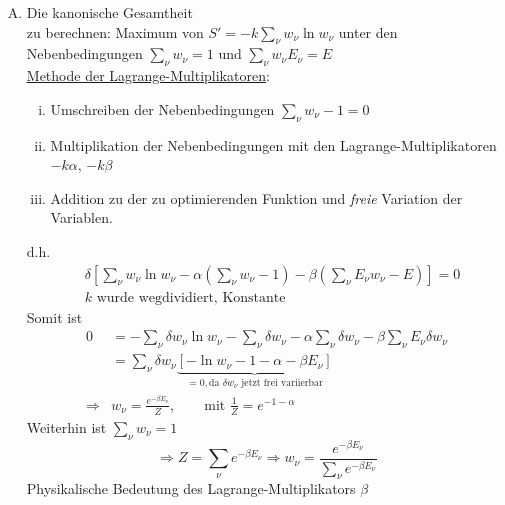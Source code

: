 \begin{enumerate}[A)]
    \item Die kanonische Gesamtheit\\
    zu berechnen: Maximum von $S' = -k \sum_\nu w_\nu \ln w_\nu$ unter den Nebenbedingungen $\sum_\nu w_\nu = 1$ und $\sum_\nu w_\nu E_\nu = E$ \\[\baselineskip]
    \underline{Methode der Lagrange-Multiplikatoren}:
    \begin{enumerate}[i)]
        \item Umschreiben der Nebenbedingungen $\sum_\nu w_\nu - 1 = 0$
        \item Multiplikation der Nebenbedingungen mit den Lagrange-Multiplikatoren $-k \alpha$, $-k \beta$
        \item Addition zu der zu optimierenden Funktion und \emph{freie} Variation der Variablen.
    \end{enumerate}
    d.h.
    \begin{equation}
        \begin{split}
            & \delta \left[ \sum_\nu w_\nu \ln w_\nu - \alpha \left( \sum_\nu w_\nu - 1 \right) - \beta \left( \sum_\nu E_\nu w_\nu - E \right)  \right] = 0 \\
            & \text{$k$ wurde wegdividiert, Konstante}
        \end{split}
    \end{equation}
    Somit ist
    \begin{equation}
        \begin{split}
            0 &= - \sum_\nu \delta w_\nu \ln w_\nu - \sum_\nu \delta w_\nu - \alpha \sum_\nu \delta w_\nu - \beta \sum_\nu E_\nu \delta w_\nu \\
            &= \sum_\nu \delta w_\nu \underbrace{\left[-\ln w_\nu - 1 - \alpha - \beta E_\nu \right]}_{=0, \text{da $\delta w_\nu$ jetzt frei variierbar}} \\
            \Rightarrow & w_\nu = \frac{e^{- \beta E_\nu}}{Z}, \qquad \text{mit } \frac{1}{Z} = e^{-1-\alpha}
        \end{split}
    \end{equation}
    Weiterhin ist $\sum_\nu w_\nu = 1$
    \begin{equation}
        \Rightarrow Z = \sum_\nu e^{-\beta E_\nu} \Rightarrow w_\nu = \frac{e^{-\beta E_\nu}}{\sum_\nu e^{-\beta E_\nu}}
    \end{equation}
    Physikalische Bedeutung des Lagrange-Multiplikators $\beta$\\

\end{enumerate}
